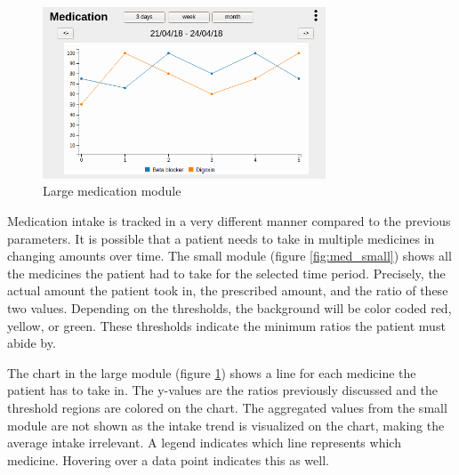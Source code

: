         \begin{figure}[!htb]
            \centering
            \includegraphics[width=0.75\textwidth]{chapters/3_design/mockups/med_large}
            \caption{Large medication module}\label{fig:med_large}
        \end{figure}

        Medication intake is tracked in a very different manner compared to the previous parameters. It is possible that a patient needs to take in multiple medicines in changing amounts over time. The small module (figure \ref{fig:med_small}) shows all the medicines the patient had to take for the selected time period. Precisely, the actual amount the patient took in, the prescribed amount, and the ratio of these two values. Depending on the thresholds, the background will be color coded red, yellow, or green. These thresholds indicate the minimum ratios the patient must abide by.

        The chart in the large module (figure \ref{fig:med_large}) shows a line for each medicine the patient has to take in. The y-values are the ratios previously discussed and the threshold regions are colored on the chart. The aggregated values from the small module are not shown as the intake trend is visualized on the chart, making the average intake irrelevant. A legend indicates which line represents which medicine. Hovering over a data point indicates this as well.